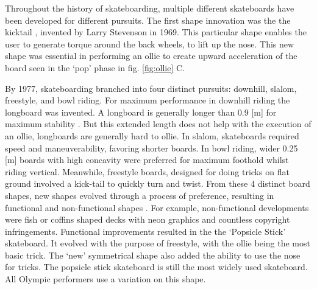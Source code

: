 Throughout the history of skateboarding, multiple different skateboards have been developed for different pursuits. The first shape innovation was the the kicktail \cite{stevenson_skateboard_1971}, invented by Larry Stevenson in 1969. This particular shape enables the user to generate torque around the back wheels, to lift up the nose. This new shape was essential in performing an ollie to create upward acceleration of the board seen in the `pop' phase in fig. \ref{fig:ollie} C. 

By 1977, skateboarding branched into four distinct pursuits: downhill, slalom, freestyle, and bowl riding. For maximum performance in downhill riding the longboard was invented. A longboard is generally longer than 0.9 [m] for maximum stability \cite{prentiss_get_2011}. But this extended length does not help with the execution of an ollie, longboards are generally hard to ollie. In slalom, skateboards required speed and maneuverability, favoring shorter boards. In bowl riding, wider 0.25 [m] boards with high concavity were preferred for maximum foothold whilst riding vertical. Meanwhile, freestyle boards, designed for doing tricks on flat ground involved a kick-tail to quickly turn and twist. From these 4 distinct board shapes, new shapes evolved through a process of preference, resulting in functional and non-functional shapes \cite{prentiss_get_2011}. For example, non-functional developments were fish or coffins shaped decks with neon graphics and countless copyright infringements. Functional improvements resulted in the the `Popsicle Stick' skateboard. It evolved with the purpose of freestyle, with the ollie being the most basic trick. The `new' symmetrical shape also added the ability to use the nose for tricks. The popsicle stick skateboard is still the most widely used skateboard. All Olympic performers use a variation on this shape. 

